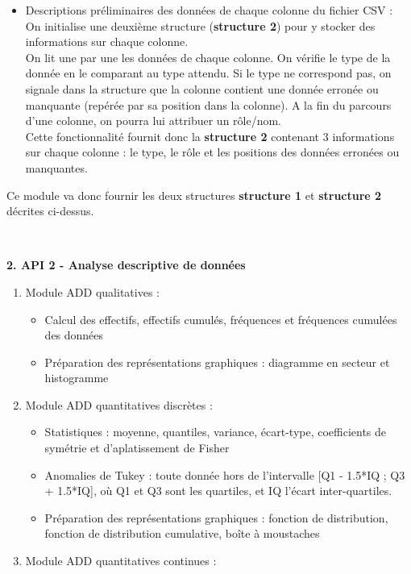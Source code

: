 \begin{description}[style=unboxed,leftmargin=0.2cm]
\begin{enumerate}
\begin{itemize}
						\item Descriptions préliminaires des données de chaque colonne du fichier CSV :\\
						On initialise une deuxième structure (\textbf{structure 2}) pour y stocker des informations sur chaque colonne.\\
						On lit une par une les données de chaque colonne. On vérifie le type de la donnée en le comparant au type attendu. Si le type ne correspond pas, on signale dans la structure que la colonne contient une donnée erronée ou manquante (repérée par sa position dans la colonne). A la fin du parcours d'une colonne, on pourra lui attribuer un rôle/nom.\\
						Cette fonctionnalité fournit donc la \textbf{structure 2} contenant 3 informations sur chaque colonne : le type, le rôle et les positions des données erronées ou manquantes.
					\end{itemize}
					Ce module va donc fournir les deux structures \textbf{structure 1} et \textbf{structure 2} décrites ci-dessus.
				\end{enumerate}
				~\\
				\item\textbf{2. API 2 - Analyse descriptive de données}
				\begin{enumerate}
					\item Module ADD qualitatives :
						\begin{itemize}
						\item Calcul des effectifs, effectifs cumulés, fréquences et fréquences cumulées des données
						\item Préparation des représentations graphiques : diagramme en secteur et histogramme
						\end{itemize}
					\item Module ADD quantitatives discrètes :
						\begin{itemize}
						\item Statistiques : moyenne, quantiles, variance, écart-type, coefficients de symétrie et d'aplatissement de Fisher
						\item Anomalies de Tukey : toute donnée hors de l'intervalle [Q1 - 1.5*IQ ; Q3 + 1.5*IQ], où Q1 et Q3 sont les quartiles, et IQ l'écart inter-quartiles.
						\item Préparation des représentations graphiques : fonction de distribution, fonction de distribution cumulative,  boîte à moustaches
						\end{itemize}
					\item Module ADD quantitatives continues :

\end{enumerate}
\end{description}

